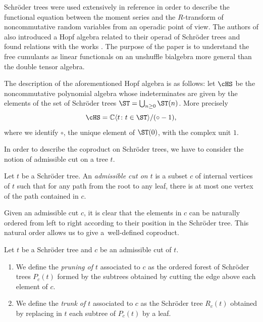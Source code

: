 Schr\"oder trees were used extensively in reference \cite{JMNT} in order to describe the functional equation between the moment series and the $R$-transform of noncommutative random variables from an operadic point of view. The authors of \cite{JMNT} also introduced a Hopf algebra related to their operad of Schr\"oder trees and found relations with the works \cite{EFP1,EFP3}. The purpose of the paper \cite{JMNT} is to understand the free cumulants as linear functionals on an unshuffle bialgebra more general than the double tensor algebra.

The description of the aforementioned Hopf algebra is as follows: let $\cHS$ be the noncommutative polynomial algebra whose indeterminates are given by the elements of the set of Schr\"oder trees $\ST = \bigcup_{n\geq0} \ST(n)$. More precisely
\[
	\cHS = \mathbb{C}\langle t\colon t\in \ST\rangle/ (\circ -1),
\]
where we identify $\circ$, the unique element of $\ST(0)$, with the complex unit $1$.

In order to describe the coproduct on Schr\"oder trees, we have to consider the notion of {admissible cut} on a tree $t$.

\begin{Definition}
\label{def:admcut}
Let $t$ be a Schr\"oder tree. An \textit{admissible cut on $t$} is a subset $c$ of internal vertices of $t$ such that for any path from the root to any leaf, there is at most one vertex of the path contained in $c$.
\end{Definition}

Given an admissible cut $c$, it is clear that the elements in $c$ can be naturally ordered from left to right according to their position in the Schr\"oder tree. This natural order allows us to give a~well-defined coproduct.

\begin{Definition}\label{def:PrunCuts}
Let $t$ be a Schr\"oder tree and $c$ be an admissible cut of $t$.
\begin{enumerate}\itemsep=0pt
\item[i)] We define the \textit{pruning of $t$} associated to $c$ as the ordered forest of Schr\"oder trees $P_c(t)$ formed by the subtrees obtained by cutting the edge above each element of $c$.
\item[ii)] We define the \textit{trunk of $t$} associated to $c$ as the Schr\"oder tree $R_c(t)$ obtained by replacing in $t$ each subtree of $P_c(t)$ by a leaf.
\end{enumerate}
\end{Definition}

